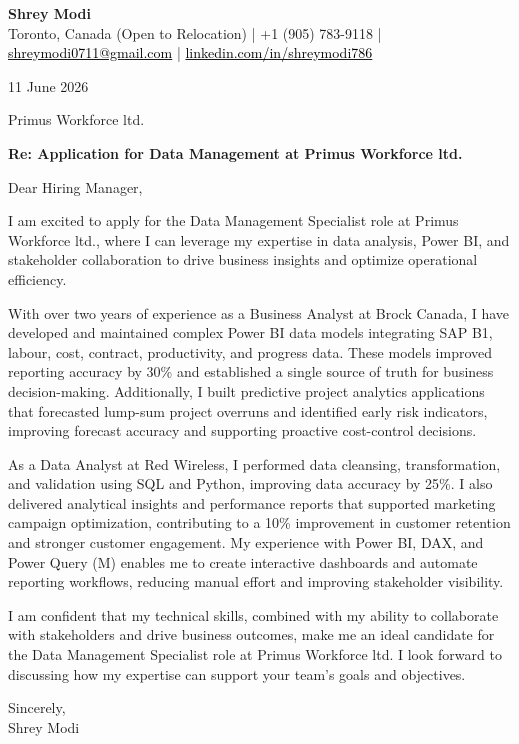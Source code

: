 \documentclass[11pt,letterpaper]{article}
\begin{document}
\begin{center}
  {\Large \bfseries \color{accent} Shrey Modi}\\[0.2em]
  {\small Toronto, Canada (Open to Relocation) | +1 (905) 783-9118 | \href{mailto:shreymodi0711@gmail.com}{\textcolor{black}{shreymodi0711@gmail.com}} | \href{https://linkedin.com/in/shreymodi786}{\textcolor{black}{linkedin.com/in/shreymodi786}}}
\end{center}

\vspace{1em}

11 June 2026

\vspace{0.5em}

Primus Workforce ltd.\\
\vspace{0.5em}

\textbf{Re: Application for Data Management at Primus Workforce ltd.}

Dear Hiring Manager,

I am excited to apply for the Data Management Specialist role at Primus Workforce ltd., where I can leverage my expertise in data analysis, Power BI, and stakeholder collaboration to drive business insights and optimize operational efficiency.

With over two years of experience as a Business Analyst at Brock Canada, I have developed and maintained complex Power BI data models integrating SAP B1, labour, cost, contract, productivity, and progress data. These models improved reporting accuracy by 30\% and established a single source of truth for business decision-making. Additionally, I built predictive project analytics applications that forecasted lump-sum project overruns and identified early risk indicators, improving forecast accuracy and supporting proactive cost-control decisions.

As a Data Analyst at Red Wireless, I performed data cleansing, transformation, and validation using SQL and Python, improving data accuracy by 25\%. I also delivered analytical insights and performance reports that supported marketing campaign optimization, contributing to a 10\% improvement in customer retention and stronger customer engagement. My experience with Power BI, DAX, and Power Query (M) enables me to create interactive dashboards and automate reporting workflows, reducing manual effort and improving stakeholder visibility.

I am confident that my technical skills, combined with my ability to collaborate with stakeholders and drive business outcomes, make me an ideal candidate for the Data Management Specialist role at Primus Workforce ltd. I look forward to discussing how my expertise can support your team's goals and objectives.

Sincerely,\\
Shrey Modi
\end{document}
